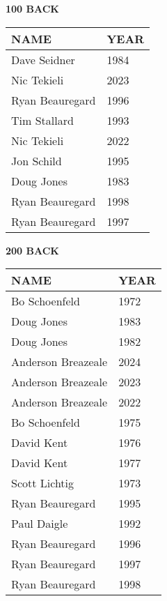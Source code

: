 \begin{minipage}[t]{0.48\textwidth}
\centering
\textbf{100 BACK}\\[0.05cm]
\begin{tabular}{@{}p{2.8cm}p{1.2cm}@{}}
\hline
\textbf{NAME} & \textbf{YEAR} \\
\hline
Dave Seidner & 1984 \\
Nic Tekieli & 2023 \\
Ryan Beauregard & 1996 \\
Tim Stallard & 1993 \\
Nic Tekieli & 2022 \\
Jon Schild & 1995 \\
Doug Jones & 1983 \\
Ryan Beauregard & 1998 \\
Ryan Beauregard & 1997 \\
\hline
\end{tabular}
\end{minipage}\hfill
\begin{minipage}[t]{0.48\textwidth}
\centering
\textbf{200 BACK}\\[0.05cm]
\begin{tabular}{@{}p{2.8cm}p{1.2cm}@{}}
\hline
\textbf{NAME} & \textbf{YEAR} \\
\hline
Bo Schoenfeld & 1972 \\
Doug Jones & 1983 \\
Doug Jones & 1982 \\
Anderson Breazeale & 2024 \\
Anderson Breazeale & 2023 \\
Anderson Breazeale & 2022 \\
Bo Schoenfeld & 1975 \\
David Kent & 1976 \\
David Kent & 1977 \\
Scott Lichtig & 1973 \\
Ryan Beauregard & 1995 \\
Paul Daigle & 1992 \\
Ryan Beauregard & 1996 \\
Ryan Beauregard & 1997 \\
Ryan Beauregard & 1998 \\
\hline
\end{tabular}
\end{minipage}

\vspace{0.4cm}

